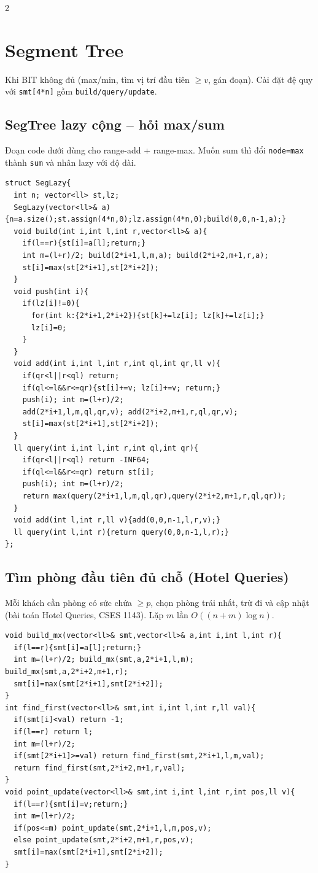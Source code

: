 \documentclass[8pt]{extarticle}
\begin{document}
\begin{multicols}{2}
\section{Segment Tree}
Khi BIT không đủ (max/min, tìm vị trí đầu tiên $\ge v$, gán đoạn). Cài đặt đệ quy với \texttt{smt[4*n]} gồm \texttt{build/query/update}.

\subsection{SegTree lazy cộng -- hỏi max/sum}
Đoạn code dưới dùng cho range-add + range-max. Muốn sum thì đổi \texttt{node=max} thành \texttt{sum} và nhân lazy với độ dài.
\begin{lstlisting}
struct SegLazy{
  int n; vector<ll> st,lz;
  SegLazy(vector<ll>& a){n=a.size();st.assign(4*n,0);lz.assign(4*n,0);build(0,0,n-1,a);}
  void build(int i,int l,int r,vector<ll>& a){
    if(l==r){st[i]=a[l];return;}
    int m=(l+r)/2; build(2*i+1,l,m,a); build(2*i+2,m+1,r,a);
    st[i]=max(st[2*i+1],st[2*i+2]);
  }
  void push(int i){
    if(lz[i]!=0){
      for(int k:{2*i+1,2*i+2}){st[k]+=lz[i]; lz[k]+=lz[i];}
      lz[i]=0;
    }
  }
  void add(int i,int l,int r,int ql,int qr,ll v){
    if(qr<l||r<ql) return;
    if(ql<=l&&r<=qr){st[i]+=v; lz[i]+=v; return;}
    push(i); int m=(l+r)/2;
    add(2*i+1,l,m,ql,qr,v); add(2*i+2,m+1,r,ql,qr,v);
    st[i]=max(st[2*i+1],st[2*i+2]);
  }
  ll query(int i,int l,int r,int ql,int qr){
    if(qr<l||r<ql) return -INF64;
    if(ql<=l&&r<=qr) return st[i];
    push(i); int m=(l+r)/2;
    return max(query(2*i+1,l,m,ql,qr),query(2*i+2,m+1,r,ql,qr));
  }
  void add(int l,int r,ll v){add(0,0,n-1,l,r,v);}
  ll query(int l,int r){return query(0,0,n-1,l,r);}
};
\end{lstlisting}

\subsection{Tìm phòng đầu tiên đủ chỗ (Hotel Queries)}
Mỗi khách cần phòng có sức chứa $\ge p$, chọn phòng trái nhất, trừ đi và cập nhật (bài toán Hotel Queries, CSES 1143). Lặp $m$ lần $O((n+m)\log n)$.
\begin{lstlisting}
void build_mx(vector<ll>& smt,vector<ll>& a,int i,int l,int r){
  if(l==r){smt[i]=a[l];return;}
  int m=(l+r)/2; build_mx(smt,a,2*i+1,l,m); build_mx(smt,a,2*i+2,m+1,r);
  smt[i]=max(smt[2*i+1],smt[2*i+2]);
}
int find_first(vector<ll>& smt,int i,int l,int r,ll val){
  if(smt[i]<val) return -1;
  if(l==r) return l;
  int m=(l+r)/2;
  if(smt[2*i+1]>=val) return find_first(smt,2*i+1,l,m,val);
  return find_first(smt,2*i+2,m+1,r,val);
}
void point_update(vector<ll>& smt,int i,int l,int r,int pos,ll v){
  if(l==r){smt[i]=v;return;}
  int m=(l+r)/2;
  if(pos<=m) point_update(smt,2*i+1,l,m,pos,v);
  else point_update(smt,2*i+2,m+1,r,pos,v);
  smt[i]=max(smt[2*i+1],smt[2*i+2]);
}
\end{lstlisting}


\end{multicols}
\end{document}
